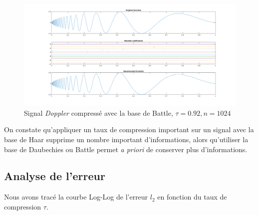 \documentclass[a4paper,12pt, openany]{book}
\theoremstyle{break}
\begin{document}
\begin{figure}[H]
  \includegraphics[width=\textwidth]{Doppler_compression_0_92Battle}
  \caption{Signal \textit{Doppler} compressé avec la base de Battle, $\tau=0.92, n=1024$}
\end{figure}

On constate qu'appliquer un taux de compression important sur un signal avec la base de Haar supprime un nombre important d'informations, alors qu'utiliser la base de Daubechies ou Battle permet \textit{a priori} de conserver plus d'informations.

\subsection{Analyse de l'erreur}
Nous avons tracé la courbe Log-Log de l'erreur $l_2$ en fonction du taux de compression $\tau$.
\end{document}
